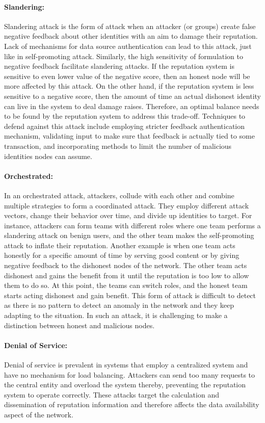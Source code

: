 \paragraph{Slandering:} Slandering attack is the form of attack when an
attacker (or groups) create false negative feedback about other identities with
an aim to damage their reputation. Lack of mechanisms for data source
authentication can lead to this attack, just like in self-promoting attack.
Similarly, the high sensitivity of formulation to negative feedback facilitate
slandering attacks. If the reputation system is sensitive to even lower value
of the negative score, then an honest node will be more affected by this
attack. On the other hand, if the reputation system is less sensitive to a
negative score, then the amount of time an actual dishonest identity can live
in the system to deal damage raises. Therefore, an optimal balance needs to be
found by the reputation system to address this trade-off. Techniques to defend
against this attack include employing stricter feedback authentication
mechanism, validating input to make sure that feedback is actually tied to some
transaction, and incorporating methods to limit the number of malicious
identities nodes can assume.   
\paragraph{Orchestrated:} In an orchestrated attack, attackers, collude with
each other and combine multiple strategies to form a coordinated attack. They
employ different attack vectors, change their behavior over time, and divide up
identities to target. For instance, attackers can form teams with different
roles where one team performs a slandering attack on benign users, and the
other team makes the self-promoting attack to inflate their reputation. Another
example is when one team acts honestly for a specific amount of time by serving
good content or by giving negative feedback to the dishonest nodes of the
network. The other team acts dishonest and gains the benefit from it until the
reputation is too low to allow them to do so. At this point, the teams can
switch roles, and the honest team starts acting dishonest and gain benefit.
This form of attack is difficult to detect as there is no pattern to detect an
anomaly in the network and they keep adapting to the situation. In such an
attack, it is challenging to make a distinction between honest and malicious
nodes. 
\paragraph{Denial of Service:} Denial of service is prevalent in systems that
employ a centralized system and have no mechanism for load balancing. Attackers
can send too many requests to the central entity and overload the system
thereby, preventing the reputation system to operate correctly. These attacks
target the calculation and dissemination of reputation information and
therefore affects the data availability aspect of the network.  
